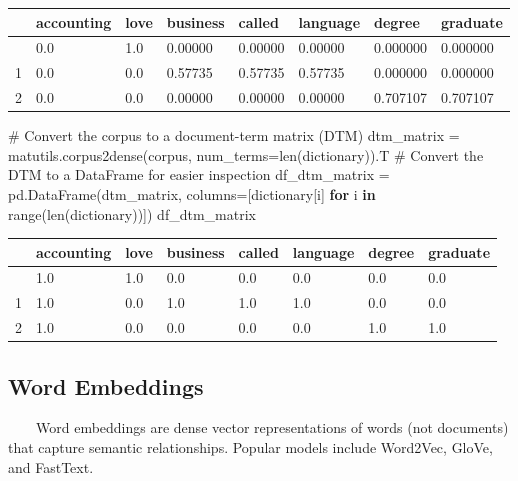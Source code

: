 \documentclass[
  letterpaper,
  DIV=11,
  numbers=noendperiod]{scrreprt}
\newenvironment{Shaded}{\begin{snugshade}}{\end{snugshade}}
\newcommand{\BuiltInTok}[1]{\textcolor[rgb]{0.00,0.23,0.31}{#1}}
\newcommand{\CommentTok}[1]{\textcolor[rgb]{0.37,0.37,0.37}{#1}}
\newcommand{\ControlFlowTok}[1]{\textcolor[rgb]{0.00,0.23,0.31}{\textbf{#1}}}
\newcommand{\KeywordTok}[1]{\textcolor[rgb]{0.00,0.23,0.31}{\textbf{#1}}}
\newcommand{\NormalTok}[1]{\textcolor[rgb]{0.00,0.23,0.31}{#1}}
\newcommand{\OperatorTok}[1]{\textcolor[rgb]{0.37,0.37,0.37}{#1}}
\newcounter{none} %
\begin{document}
{\def\LTcaptype{none} %
\begin{longtable}[]{@{}llllllll@{}}
\toprule\noalign{}
& accounting & love & business & called & language & degree &
graduate \\
\midrule\noalign{}
\endhead
\bottomrule\noalign{}
\endlastfoot
0 & 0.0 & 1.0 & 0.00000 & 0.00000 & 0.00000 & 0.000000 & 0.000000 \\
1 & 0.0 & 0.0 & 0.57735 & 0.57735 & 0.57735 & 0.000000 & 0.000000 \\
2 & 0.0 & 0.0 & 0.00000 & 0.00000 & 0.00000 & 0.707107 & 0.707107 \\
\end{longtable}
}

\begin{Shaded}
\begin{Highlighting}[]
\CommentTok{\# Convert the corpus to a document{-}term matrix (DTM)}
\NormalTok{dtm\_matrix }\OperatorTok{=}\NormalTok{ matutils.corpus2dense(corpus, num\_terms}\OperatorTok{=}\BuiltInTok{len}\NormalTok{(dictionary)).T}
\CommentTok{\# Convert the DTM to a DataFrame for easier inspection}
\NormalTok{df\_dtm\_matrix }\OperatorTok{=}\NormalTok{ pd.DataFrame(dtm\_matrix, columns}\OperatorTok{=}\NormalTok{[dictionary[i] }\ControlFlowTok{for}\NormalTok{ i }\KeywordTok{in} \BuiltInTok{range}\NormalTok{(}\BuiltInTok{len}\NormalTok{(dictionary))])}
\NormalTok{df\_dtm\_matrix}
\end{Highlighting}
\end{Shaded}

{\def\LTcaptype{none} %
\begin{longtable}[]{@{}llllllll@{}}
\toprule\noalign{}
& accounting & love & business & called & language & degree &
graduate \\
\midrule\noalign{}
\endhead
\bottomrule\noalign{}
\endlastfoot
0 & 1.0 & 1.0 & 0.0 & 0.0 & 0.0 & 0.0 & 0.0 \\
1 & 1.0 & 0.0 & 1.0 & 1.0 & 1.0 & 0.0 & 0.0 \\
2 & 1.0 & 0.0 & 0.0 & 0.0 & 0.0 & 1.0 & 1.0 \\
\end{longtable}
}

\subsection{Word Embeddings}\label{word-embeddings}

~~~~Word embeddings are dense vector representations of words (not
documents) that capture semantic relationships. Popular models include
Word2Vec, GloVe, and FastText.
\end{document}
